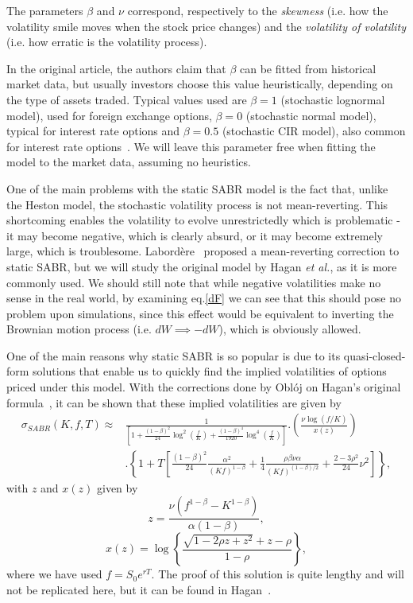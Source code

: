 The parameters $\beta$ and $\nu$ correspond, respectively to the \emph{skewness} (i.e. how the volatility smile moves when the stock price changes) and the \emph{volatility of volatility} (i.e. how erratic is the volatility process).



In the original article, the authors claim that $\beta$ can be fitted from historical market data, but usually investors choose this value heuristically, depending on the type of assets traded. Typical values used are $\beta=1$ (stochastic lognormal model), used for foreign exchange options, $\beta=0$ (stochastic normal model), typical for interest rate options and $\beta=0.5$ (stochastic CIR model), also common for interest rate options~\cite{Hagan}.
We will leave this parameter free when fitting the model to the market data, assuming no heuristics.

One of the main problems with the static SABR model is the fact that, unlike the Heston model, the stochastic volatility process is not mean-reverting. This shortcoming enables the volatility to evolve unrestrictedly which is problematic - it may become negative, which is clearly absurd, or it may become extremely large, which is troublesome. Labordère~\cite{Labordere} proposed a mean-reverting correction to static SABR, but we will study the original model by Hagan \textit{et al.}, as it is more commonly used. We should still note that while negative volatilities make no sense in the real world, by examining eq.\eqref{dF} we can see that this should pose no problem upon simulations, since this effect would be equivalent to inverting the Brownian motion process (i.e. $dW\implies-dW$), which is obviously allowed.

One of the main reasons why static SABR is so popular is due to its quasi-closed-form solutions that enable us to quickly find the implied volatilities of options priced under this model. With the corrections done by Oblój on Hagan's original formula~\cite{Obloj}, it can be shown that these implied volatilities are given by
\begin{equation}\label{sabr}
\begin{split}
\sigma_{SABR}(K,f,T)\approx&\frac{1}{\displaystyle\left[1+\frac{(1-\beta)^2}{24}\log^2\left(\frac{f}{K}\right)+\frac{(1-\beta)^4}{1920}\log^4\left(\frac{f}{K}\right)\right]}.\left(\frac{\nu\log\left(f/K\right)}{x(z)}\right)\\
&.\left\{1+T\left[\frac{(1-\beta)^2}{24}\frac{\alpha^2}{(Kf)^{1-\beta}}+\frac{1}{4}\frac{\rho\beta\nu\alpha}{(Kf)^{(1-\beta)/2}}+\frac{2-3\rho^2}{24}\nu^2\right]\right\},
\end{split}
\end{equation}
\noindent with $z$ and $x(z)$ given by
\begin{equation}
z=\frac{\nu\left(f^{1-\beta}-K^{1-\beta}\right)}{\alpha(1-\beta)},
\end{equation}
\begin{equation}
x(z)=\log\left\{\frac{\sqrt{1-2\rho z+z^2}+z-\rho}{1-\rho}\right\},
\end{equation}
\noindent where we have used $f=S_0e^{rT}$. The proof of this solution is quite lengthy and will not be replicated here, but it can be found in Hagan~\cite{Hagan}.

